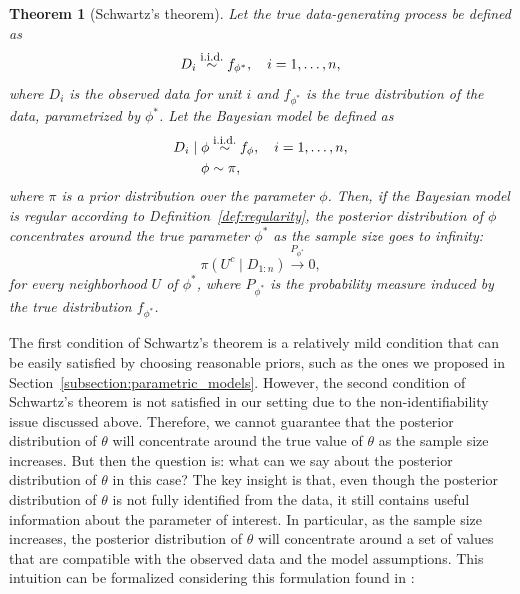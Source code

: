 \documentclass[12pt]{article}
\newtheorem{theorem}{Theorem}
\newcommand{\iid}{\overset{\text{\footnotesize i.i.d.}}{\sim}}
\begin{document}
\begin{theorem}[Schwartz's theorem]
  Let the true data-generating process be defined as
  \begin{equation}
    D_{i} \iid f_{\phi^{*}}, \quad i = 1, \ldots, n,
  \end{equation}
  where \(D_{i}\) is the observed data for unit \(i\) and \(f_{\phi^{*}}\) is the true distribution of the data, parametrized by \(\phi^{*}\). Let the Bayesian model be defined as
  \begin{align}
    \begin{split}
      D_{i} \mid \phi & \iid f_{\phi}, \quad i = 1, \ldots, n, \\
      \phi & \sim \pi,
    \end{split}
  \end{align}
  where \(\pi\) is a prior distribution over the parameter \(\phi\). Then, if the Bayesian model is regular according to Definition~\ref{def:regularity}, the posterior distribution of \(\phi\) concentrates around the true parameter \(\phi^{*}\) as the sample size goes to infinity:
  \begin{equation}
    \pi \left( U^{c} \mid D_{1:n} \right) \overset{P_{\phi^{*}}}{\to} 0,
  \end{equation}
  for every neighborhood \(U\) of \(\phi^{*}\), where \(P_{\phi^{*}}\) is the probability measure induced by the true distribution \(f_{\phi^{*}}\).
\end{theorem}
The first condition of Schwartz's theorem is a relatively mild condition that can be easily satisfied by choosing reasonable priors, such as the ones we proposed in Section~\ref{subsection:parametric_models}. However, the second condition of Schwartz's theorem is not satisfied in our setting due to the non-identifiability issue discussed above. Therefore, we cannot guarantee that the posterior distribution of \(\theta\) will concentrate around the true value of \(\theta\) as the sample size increases. But then the question is: what can we say about the posterior distribution of \(\theta\) in this case? The key insight is that, even though the posterior distribution of \(\theta\) is not fully identified from the data, it still contains useful information about the parameter of interest. In particular, as the sample size increases, the posterior distribution of \(\theta\) will concentrate around a set of values that are compatible with the observed data and the model assumptions. This intuition can be formalized considering this formulation found in \cite{gustafson2010bayesian}:
\end{document}
